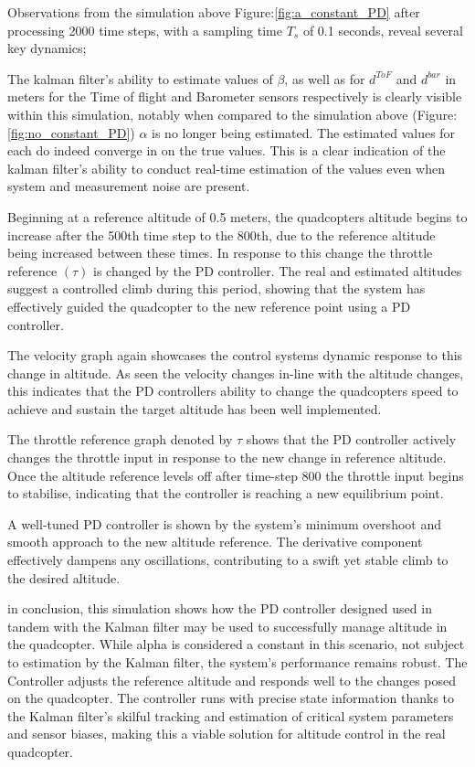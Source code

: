 \documentclass{report}
\begin{document}
Observations from the simulation above Figure:\ref{fig:a_constant_PD} after
processing 2000 time steps, with a sampling time \(T_s\) of 0.1 seconds, reveal
several key dynamics;

The kalman filter’s ability to estimate values of \(\beta\), as well as for
\(d^{ToF}\) and \(d^{bar}\) in meters for the Time of flight and Barometer
sensors respectively is clearly visible within this simulation, notably when
compared to the simulation above (Figure:\ref{fig:no_constant_PD}) \(\alpha\) is
no longer being estimated. The estimated values for each do indeed converge in
on the true values. This is a clear indication of the kalman filter’s ability to
conduct real-time estimation of the values even when system and measurement
noise are present.

Beginning at a reference altitude of 0.5 meters, the quadcopters altitude begins
to increase after the 500th time step to the 800th, due to the reference
altitude being increased between these times. In response to this change the
throttle reference \((\tau)\) is changed by the PD controller. The real and
estimated altitudes suggest a controlled climb during this period, showing that
the system has effectively guided the quadcopter to the new reference point
using a PD controller.

The velocity graph again showcases the control systems dynamic response to this
change in altitude. As seen the velocity changes in-line with the altitude
changes, this indicates that the PD controllers ability to change the
quadcopters speed to achieve and sustain the target altitude has been well
implemented.

The throttle reference graph denoted by \(\tau\) shows that the PD controller
actively changes the throttle input in response to the new change in reference
altitude. Once the altitude reference levels off after time-step 800 the throttle
input begins to stabilise, indicating that the controller is reaching a new
equilibrium point.
 
A well-tuned PD controller is shown by the system's minimum overshoot and smooth
approach to the new altitude reference. The derivative component effectively
dampens any oscillations, contributing to a swift yet stable climb to the
desired altitude.

in conclusion, this simulation shows how the PD controller designed used in
tandem with the Kalman filter may be used to successfully manage altitude in the
quadcopter. While alpha is considered a constant in this scenario, not subject
to estimation by the Kalman filter, the system's performance remains robust. The
Controller adjusts the reference altitude and responds well to the changes posed
on the quadcopter. The controller runs with precise state information thanks to
the Kalman filter's skilful tracking and estimation of critical system
parameters and sensor biases, making this a viable solution for altitude control
in the real quadcopter.
\end{document}
